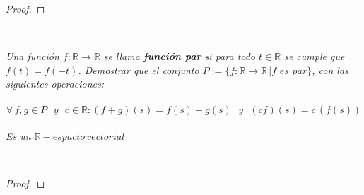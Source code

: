 \documentclass[11pt,letterpaper]{article}
\begin{document}
\begin{proof}
    
\end{proof}\,\\
\begin{tcolorbox}[
	title = \textcolor{black}{\textcolor{white}{Problema 6}},]
\textit{Una funci\'on $f:\mathbb{R}\rightarrow \mathbb{R}$ se llama \textbf{funci\'on par} si para todo $t\in \mathbb{R}$ se cumple que
$f(t)=f(-t)$. Demostrar que el conjunto $P:=\{f:\mathbb{R}\rightarrow\mathbb{R}\,| f\,\,es \,\,par\}$, con las siguientes operaciones:\,\\
\,\\
\begin{equation*}
    \forall\,f,g \in P\,\,\,\,y\,\,\,\,c\in \mathbb{R}:(f+g)(s)=f(s)+g(s)\,\,\,\,y\,\,\,\,(cf)(s)=c\,(f(s))
\end{equation*}\,\\
Es un $\mathbb{R}-espacio\,vectorial$ 
}
\end{tcolorbox}\,\\
\begin{proof}
    
\end{proof}\,\\
\end{document}
